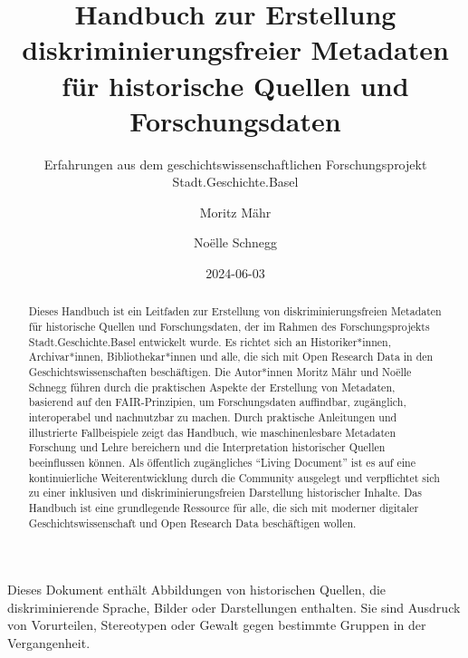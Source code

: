 \documentclass[
  letterpaper,
  DIV=11,
  numbers=noendperiod]{scrartcl}
\title{Handbuch zur Erstellung diskriminierungsfreier Metadaten für
historische Quellen und Forschungsdaten}
\subtitle{Erfahrungen aus dem geschichtswissenschaftlichen
Forschungsprojekt Stadt.Geschichte.Basel}
\author{Moritz Mähr \and Noëlle Schnegg}
\date{2024-06-03}
\begin{document}
\maketitle
\begin{abstract}
Dieses Handbuch ist ein Leitfaden zur Erstellung von
diskriminierungsfreien Metadaten für historische Quellen und
Forschungsdaten, der im Rahmen des Forschungsprojekts
Stadt.Geschichte.Basel entwickelt wurde. Es richtet sich an
Historiker*innen, Archivar*innen, Bibliothekar*innen und alle, die sich
mit Open Research Data in den Geschichtswissenschaften beschäftigen. Die
Autor*innen Moritz Mähr und Noëlle Schnegg führen durch die praktischen
Aspekte der Erstellung von Metadaten, basierend auf den FAIR-Prinzipien,
um Forschungsdaten auffindbar, zugänglich, interoperabel und nachnutzbar
zu machen. Durch praktische Anleitungen und illustrierte Fallbeispiele
zeigt das Handbuch, wie maschinenlesbare Metadaten Forschung und Lehre
bereichern und die Interpretation historischer Quellen beeinflussen
können. Als öffentlich zugängliches ``Living Document'' ist es auf eine
kontinuierliche Weiterentwicklung durch die Community ausgelegt und
verpflichtet sich zu einer inklusiven und diskriminierungsfreien
Darstellung historischer Inhalte. Das Handbuch ist eine grundlegende
Ressource für alle, die sich mit moderner digitaler
Geschichtswissenschaft und Open Research Data beschäftigen wollen.
\end{abstract}


\begin{tcolorbox}[enhanced jigsaw, arc=.35mm, left=2mm, coltitle=black, leftrule=.75mm, bottomrule=.15mm, colframe=quarto-callout-warning-color-frame, bottomtitle=1mm, colback=white, toprule=.15mm, toptitle=1mm, opacityback=0, colbacktitle=quarto-callout-warning-color!10!white, breakable, rightrule=.15mm, titlerule=0mm, title=\textcolor{quarto-callout-warning-color}{\faExclamationTriangle}\hspace{0.5em}{Warnung}, opacitybacktitle=0.6]

Dieses Dokument enthält Abbildungen von historischen Quellen, die
diskriminierende Sprache, Bilder oder Darstellungen enthalten. Sie sind
Ausdruck von Vorurteilen, Stereotypen oder Gewalt gegen bestimmte
Gruppen in der Vergangenheit.

\end{tcolorbox}
\end{document}
